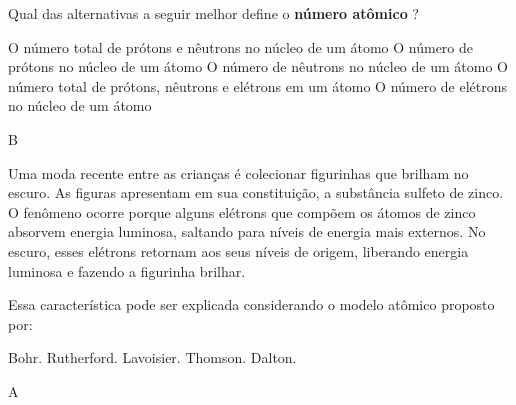 \documentclass[9 pt]{scrartcl}
\def\PQ{0.84} %
\begin{document}
\begin{exercise}[points=\PQ]
Qual das alternativas a seguir melhor define o \textbf{número atômico} ?

\begin{choice}
\choice O número total de prótons e nêutrons no núcleo de um átomo
\choice O número de prótons no núcleo de um átomo
\choice O número de nêutrons no núcleo de um átomo
\choice O número total de prótons, nêutrons e elétrons em um átomo
\choice O número de elétrons no núcleo de um átomo
\end{choice}
\end{exercise}
\begin{solution}
B
\end{solution}





\begin{exercise}[points=\PQ]
Uma moda recente entre as crianças é colecionar figurinhas que brilham no escuro. As figuras apresentam em sua constituição, a substância sulfeto de zinco. O fenômeno ocorre porque alguns elétrons que compõem os átomos de zinco absorvem energia luminosa, saltando para níveis de energia mais externos. No escuro, esses elétrons retornam aos seus níveis de origem, liberando energia luminosa e fazendo a figurinha brilhar.

Essa característica pode ser explicada considerando o modelo atômico proposto por:

\begin{choice}
\choice Bohr.
\choice Rutherford.
\choice Lavoisier.
\choice Thomson.
\choice Dalton.
\end{choice}
\end{exercise}
\begin{solution}
A
\end{solution}
\end{document}

